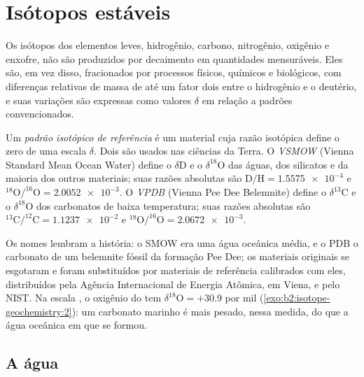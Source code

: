 \section{Isótopos estáveis}

Os isótopos dos elementos leves, hidrogênio, carbono, nitrogênio, oxigênio e
enxofre, não são produzidos por decaimento em quantidades mensuráveis. Eles são, em vez disso,
fracionados por processos físicos, químicos e biológicos, com diferenças relativas de massa
de até um fator dois entre o hidrogênio e o deutério, e suas
variações são expressas como valores $\delta$ em relação a padrões convencionados.

\begin{definition}\label{def:b2:isotope-geochemistry:standards}
Um \emph{padrão isotópico de referência} é um
material cuja razão isotópica define o zero de uma escala $\delta$. Dois são usados
nas ciências da Terra. O \emph{VSMOW} (Vienna Standard Mean Ocean
Water) define o $\delta\mathrm{D}$ e o $\delta^{18}\mathrm{O}$ das águas, dos silicatos e
da maioria dos outros materiais; suas razões absolutas são $\mathrm{D}/\mathrm{H} =
\num{1.5575e-4}$ e $^{18}\mathrm{O}/^{16}\mathrm{O} = \num{2.0052e-3}$.
O \emph{VPDB} (Vienna Pee Dee Belemnite) define o $\delta^{13}\mathrm{C}$
e o $\delta^{18}\mathrm{O}$ dos carbonatos de baixa temperatura; suas razões absolutas
são $^{13}\mathrm{C}/^{12}\mathrm{C} = \num{1.1237e-2}$ e
$^{18}\mathrm{O}/^{16}\mathrm{O} = \num{2.0672e-3}$.
\end{definition}

Os nomes lembram a história: o SMOW era uma água oceânica média, e o PDB o
carbonato de um belemnite fóssil da formação Pee Dee; os materiais originais
se esgotaram e foram substituídos por materiais de referência calibrados com eles,
distribuídos pela Agência Internacional de Energia Atômica, em Viena, e pelo NIST.
Na escala , o oxigênio do  tem $\delta^{18}\mathrm{O} = +30.9$ por mil
(\cref{exo:b2:isotope-geochemistry:2}): um carbonato marinho é mais pesado, nessa medida, do que a água oceânica em que se
formou.

\subsection{A água}

